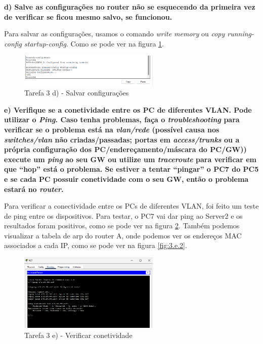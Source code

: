 \documentclass[11pt,english, openright, oneside]{book}
\begin{document}
\textbf{d)	Salve as configurações no router não se esquecendo da primeira vez de verificar se ficou mesmo salvo, se funcionou.}
\vspace{0.2cm}

Para salvar as configurações, usamos o comando \textit{write memory} ou
\textit{copy running-config startup-config}. Como se pode ver na figura
\ref{fig:3d}.
\vspace{0.2cm}

\begin{figure}[H]
    \centering
    \includegraphics[width=0.6\textwidth]{imagens/Tarefa3/3.d.png}
    \caption{Tarefa 3 d) - Salvar configurações}
    \label{fig:3d}
\end{figure}

\vspace{0.8cm}

\textbf{e) Verifique se a conetividade entre os PC de diferentes VLAN. Pode
utilizar o \textit{Ping}. Caso tenha problemas, faça o \textit{troubleshooting}
para verificar se o problema está na \textit{vlan/rede} (possível causa nos
\textit{switches/vlan} não criadas/passadas; portas em \textit{access/trunks} ou
a própria configuração dos PC/endereçamento/máscara do PC/GW)) execute um
\textit{ping} ao seu GW ou utilize um \textit{traceroute} para verificar em que
“hop” está o problema. Se estiver a tentar “pingar” o PC7 do PC5 e se cada PC
possuir conetividade com o seu GW, então o problema estará no \textit{router}.}
\vspace{0.2cm}

Para verificar a conectividade entre os PCs de diferentes VLAN, foi feito um
teste de ping entre os dispositivos. Para testar, o PC7 vai dar ping ao Server2
e os resultados foram positivos, como se pode ver na figura \ref{fig:3.e.1}.
Também podemos visualizar a tabela de arp do router A, onde podemos ver os
endereços MAC associados a cada IP, como se pode ver na figura \ref{fig:3.e.2}.
\vspace{0.2cm}

\begin{figure}[H]
    \centering
    \includegraphics[width=0.6\textwidth]{imagens/Tarefa3/3.e.1.png}
    \caption{Tarefa 3 e) - Verificar conetividade}
    \label{fig:3.e.1}
\end{figure}
\end{document}
